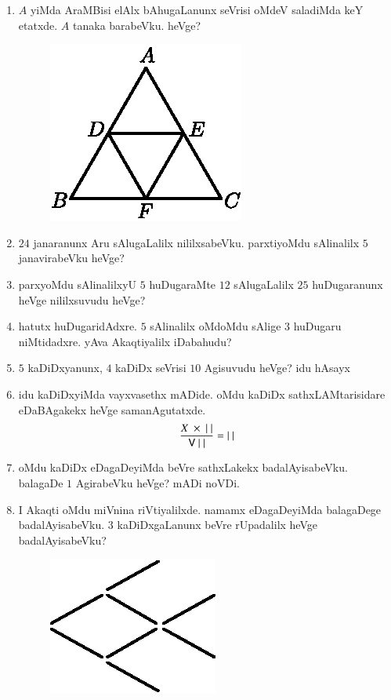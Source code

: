 \begin{enumerate}
\item $A$ yiMda AraMBisi elAlx bAhugaLanunx seVrisi oMdeV saladiMda keY etatxde. $A$ tanaka barabeVku. heVge?
\begin{figure}[H]
\centering
\includegraphics{src/figures/exr34.eps}
\end{figure}

\item $24$ janaranunx Aru sAlugaLalilx nililxsabeVku. parxtiyoMdu sAlinalilx $5$ janavirabeVku heVge?

\item parxyoMdu sAlinalilxyU $5$ huDugaraMte $12$ sAlugaLalilx $25$ huDugaranunx heVge nililxsuvudu heVge?

\item hatutx huDugaridAdxre. $5$ sAlinalilx oMdoMdu sAlige $3$ huDugaru niMtidadxre. yAva Akaqtiyalilx iDabahudu?

\item $5$ kaDiDxyanunx, $4$ kaDiDx seVrisi $10$ Agisuvudu heVge? idu hAsayx

\item idu kaDiDxyiMda vayxvasethx mADide. oMdu kaDiDx sathxLAMtarisidare eDaBAgakekx heVge samanAgutatxde.
$$
\frac{X \ \times \ |~|}{{\sf V}~|~|}=|~|
$$

\item oMdu kaDiDx eDagaDeyiMda beVre sathxLakekx badalAyisabeVku. balagaDe $1$ AgirabeVku heVge? mADi noVDi.


\item I Akaqti oMdu miVnina riVtiyalilxde. namamx eDagaDeyiMda balagaDege badalAyisabeVku. $3$ kaDiDxgaLanunx beVre rUpadalilx heVge badalAyisabeVku?
\begin{figure}[H]
\centering
\includegraphics{src/figures/exr41.eps}
\end{figure}


\end{enumerate}
